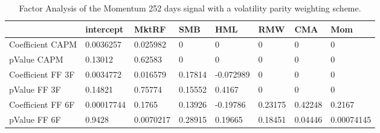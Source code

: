 \begin{table}[H]
\centering
\begin{tabular}{llllllll}
\hline& intercept & MktRF & SMB & HML & RMW & CMA & Mom \\ 
\hline 
Coefficient CAPM & 0.0036257 & 0.025982 & 0 & 0 & 0 & 0 & 0 \\ 
pValue CAPM & 0.13012 & 0.62583 & 0 & 0 & 0 & 0 & 0 \\ 
Coefficient FF 3F & 0.0034772 & 0.016579 & 0.17814 & -0.072989 & 0 & 0 & 0 \\ 
pValue FF 3F & 0.14821 & 0.75774 & 0.15552 & 0.4167 & 0 & 0 & 0 \\ 
Coefficient FF 6F & 0.00017744 & 0.1765 & 0.13926 & -0.19786 & 0.23175 & 0.42248 & 0.2167 \\ 
pValue FF 6F & 0.9428 & 0.0070217 & 0.28915 & 0.19665 & 0.18451 & 0.04446 & 0.00074145 \\ 
\hline
\end{tabular}
\caption{Factor Analysis of the Momentum 252 days signal with a volatility parity weighting scheme.}
\label{MOM252VP_FACTOR}
\end{table}